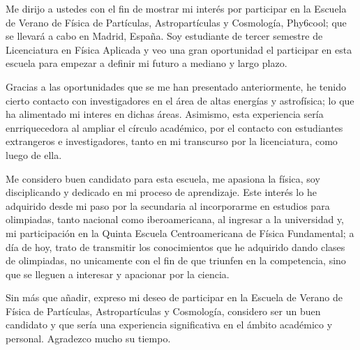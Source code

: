 \documentclass[12pt,stdletter,orderfromtodate,sigleft]{newlfm}
\begin{document}
\begin{newlfm}
    
\justify
Me dirijo a ustedes con el fin de mostrar mi interés por participar en la Escuela de Verano de Física de Partículas, Astropartículas y Cosmología, Phy6cool; que se llevará a cabo en Madrid, España. Soy estudiante de tercer semestre de Licenciatura en Física Aplicada y veo una gran oportunidad el participar en esta escuela para empezar a definir mi futuro a mediano y largo plazo. 

\justify
Gracias a las oportunidades que se me han presentado anteriormente, he tenido cierto contacto con investigadores en el área de altas energías y astrofísica; lo que ha alimentado mi interes en dichas áreas. Asimismo, esta experiencia sería enrriquecedora al ampliar el círculo académico, por el contacto con estudiantes extrangeros e investigadores, tanto en mi transcurso por la licenciatura, como luego de ella.

\justify
Me considero buen candidato para esta escuela, me apasiona la física, soy disciplicando y dedicado en mi proceso de aprendizaje. Este interés lo he adquirido desde mi paso por la secundaria al incorporarme en estudios para olimpiadas, tanto nacional como iberoamericana, al ingresar a la universidad y, mi participación en la Quinta Escuela Centroamericana de Física Fundamental; a día de hoy, trato de transmitir los conocimientos que he adquirido dando clases de olimpiadas, no unicamente con el fin de que triunfen en la competencia, sino que se lleguen a interesar y apacionar por la ciencia.

\justify
Sin más que añadir, expreso mi deseo de participar en la Escuela de Verano de Física de Partículas, Astropartículas y Cosmología, considero ser un buen candidato y que sería una experiencia significativa en el ámbito académico y personal. Agradezco mucho su tiempo.
\end{newlfm}
\end{document}
